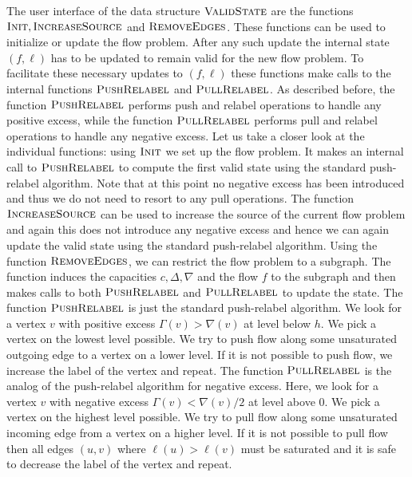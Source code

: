 \documentclass[11pt]{article}
\newcommand\bell{\boldsymbol{\mathit{\ell}}}
\newcommand\cc{\boldsymbol{\mathit{c}}}
\newcommand\ff{\boldsymbol{\mathit{f}}}
\begin{document}
The user interface of the data structure $\textsc{ValidState}$ are the functions $\textsc{Init}, \textsc{IncreaseSource}$ and $ \textsc{RemoveEdges}$. These functions can be used to initialize or update the flow problem. After any such update the internal state $(\ff,\bell)$ has to be updated to remain valid for the new flow problem. To facilitate these necessary updates to $(\ff,\bell)$ these functions make calls to the internal functions $\textsc{PushRelabel}$ and $ \textsc{PullRelabel}$. As described before, the function $\textsc{PushRelabel}$ performs push and relabel operations to handle any positive excess, while the function $\textsc{PullRelabel}$ performs pull and relabel operations to handle any negative excess. Let us take a closer look at the individual functions: using $\textsc{Init}$ we set up the flow problem. It makes an internal call to $\textsc{PushRelabel}$ to compute the first valid state using the standard push-relabel algorithm. Note that at this point no negative excess has been introduced and thus we do not need to resort to any pull operations. The function $\textsc{IncreaseSource}$ can be used to increase the source of the current flow problem and again this does not introduce any negative excess and hence we can again update the valid state using the standard push-relabel algorithm. Using the function $\textsc{RemoveEdges}$, we can restrict the flow problem to a subgraph. The function induces the capacities $\cc, \Delta, \nabla$ and the flow $\ff$ to the subgraph and then makes calls to both $\textsc{PushRelabel}$ and $\textsc{PullRelabel}$ to update the state. The function $\textsc{PushRelabel}$ is just the standard push-relabel algorithm. We look for a vertex $v$ with positive excess $\Gamma(v) > \nabla(v)$ at level below $h$. We pick a vertex on the lowest level possible. We try to push flow along some unsaturated outgoing edge to a vertex on a lower level. If it is not possible to push flow, we increase the label of the vertex and repeat. The function $\textsc{PullRelabel}$ is the analog of the push-relabel algorithm for negative excess. Here, we look for a vertex $v$ with negative excess $\Gamma(v) < \nabla(v)/2$ at level above $0$. We pick a vertex on the highest level possible. We try to pull flow along some unsaturated incoming edge from a vertex on a higher level. If it is not possible to pull flow then all edges $(u,v)$ where $\bell(u) > \bell(v)$ must be saturated and it is safe to decrease the label of the vertex and repeat. 
\end{document}
